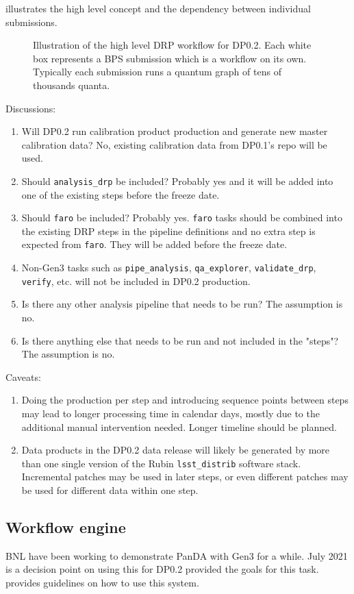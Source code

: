  illustrates the high level concept and the dependency between individual submissions.

\begin{figure}
\begin{center}

\end{center}
\caption{Illustration of the high level DRP workflow for DP0.2. Each white box represents a BPS submission which is a workflow on its own. Typically each submission runs a quantum graph of tens of thousands quanta.
\label{fig:highLevelWorkflow}}
\end{figure}

Discussions:
\begin{enumerate}
  \item Will DP0.2 run calibration product production and generate new master calibration data? No, existing calibration data from DP0.1's repo will be used.
  \item Should \texttt{analysis\_drp} be included? Probably yes and it will be added into one of the existing steps before the freeze date.
  \item Should \texttt{faro} be included? Probably yes. \texttt{faro} tasks should be combined into the existing DRP steps in the pipeline definitions and no extra step is expected from \texttt{faro}. They will be added before the freeze date.
  \item Non-Gen3 tasks such as \texttt{pipe\_analysis}, \texttt{qa\_explorer}, \texttt{validate\_drp}, \texttt{verify}, etc. will not be included in DP0.2 production.
  \item Is there any other analysis pipeline that needs to be run? The assumption is no.
  \item Is there anything else that needs to be run and not included in the "steps"? The assumption is no.
\end{enumerate}

Caveats:
\begin{enumerate}
  \item Doing the production per step and introducing sequence points between steps may lead to longer processing time in calendar days, mostly due to the additional manual intervention needed. Longer timeline should be planned.
  \item Data products in the DP0.2 data release will likely be generated by more than one single version of the Rubin \texttt{lsst\_distrib} software stack. Incremental patches may be used in later steps, or even different patches may be used for different data within one step.
\end{enumerate}

\subsection {Workflow engine}
BNL have been working to demonstrate PanDA with Gen3 for a while. July 2021 is a decision point on using this for DP0.2
 provided the goals for this task.  provides guidelines on how to use this system.


